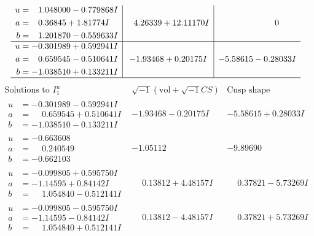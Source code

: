 \documentclass[1p]{elsarticle_modified}
\theoremstyle{definition}
\newcommand{\I}{\sqrt{-1}}
\begin{document}
$$\begin{array}{c|c|c}
\begin{aligned}
u &= \phantom{-}1.048000 - 0.779868 I \\
a &= \phantom{-}0.36845 + 1.81774 I \\
b &= \phantom{-}1.201870 - 0.559633 I\end{aligned}
 & \phantom{-}4.26339 + 12.11170 I & \phantom{-0.000000 } 0 \\ \hline\begin{aligned}
u &= -0.301989 + 0.592941 I \\
a &= \phantom{-}0.659545 - 0.510641 I \\
b &= -1.038510 + 0.133211 I\end{aligned}
 & -1.93468 + 0.20175 I & -5.58615 - 0.28033 I\\
 \hline 
 \end{array}$$\newpage$$\begin{array}{c|c|c}  
\text{Solutions to }I^u_{1}& \I (\text{vol} + \sqrt{-1}CS) & \text{Cusp shape}\\
 \hline 
\begin{aligned}
u &= -0.301989 - 0.592941 I \\
a &= \phantom{-}0.659545 + 0.510641 I \\
b &= -1.038510 - 0.133211 I\end{aligned}
 & -1.93468 - 0.20175 I & -5.58615 + 0.28033 I \\ \hline\begin{aligned}
u &= -0.663608\phantom{ +0.000000I} \\
a &= \phantom{-}0.240549\phantom{ +0.000000I} \\
b &= -0.662103\phantom{ +0.000000I}\end{aligned}
 & -1.05112\phantom{ +0.000000I} & -9.89690\phantom{ +0.000000I} \\ \hline\begin{aligned}
u &= -0.099805 + 0.595750 I \\
a &= -1.14595 + 0.84142 I \\
b &= \phantom{-}1.054840 - 0.512141 I\end{aligned}
 & \phantom{-}0.13812 + 4.48157 I & \phantom{-}0.37821 - 5.73269 I \\ \hline\begin{aligned}
u &= -0.099805 - 0.595750 I \\
a &= -1.14595 - 0.84142 I \\
b &= \phantom{-}1.054840 + 0.512141 I\end{aligned}
 & \phantom{-}0.13812 - 4.48157 I & \phantom{-}0.37821 + 5.73269 I \\ \hline\begin{aligned}

\end{aligned}
\end{array}$$
\end{document}
